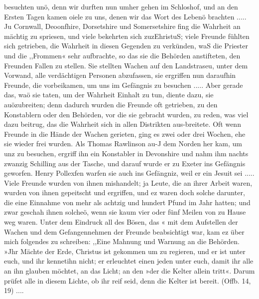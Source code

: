 besuchten unö, denn wir durften nun umher gehen im Schloshof,
und an den Ersten Tagen kamen oiele zu uns, denen wir das
Wort des Lebenö brachten .....
Ju Cornwall, Deoonfhire, Dorsetshire und Somersetshire
fing die Wahrheit an mächtig zu spriesen, und viele bekehrten sich
zuzEhristuS; viele Freunde fühlten sich getrieben, die Wahrheit
in diesen Gegenden zu verkünden, waS die Priester und die
,,Frommen« sehr aufbrachte, so das sie die Behörden anstifteten,
den Freunden Fallen zu stellen. Sie stellten Wachen auf den
Landstraseu, unter dem Vorwand, alle verdächtigen Personen
abzufassen, sie ergriffen nun daraufhin Freunde, die vorbeikamen,
um uns im Gefängnis zu besuchen ..... Aber gerade das,
waö sie taten, um der Wahrheit Einhalt zu tun, diente dazu, sie
auözubreiten; denn dadurch wurden die Freunde oft getrieben, zu
den Konstablern oder den Behörden, vor die sie gebracht wurden,
zu reden, was viel dazu beitrug, das die Wahrheit sich in allen
Distrikten aus-breitete. Oft wenn Freunde in die Hände der
Wachen gerieten, ging es zwei oder drei Wochen, ehe sie wieder
frei wurden.
Als Thomas Rawlinson au-J dem Norden her kam, um unz
zu besuchen, ergriff ihn ein Konstabler in Devonshire und nahm
ihm nachts zwanzig Schilling aus der Tasche, und darauf wurde
er zu Exeter ins Gefängnis geworfen. Henry Pollexfen warfen
sie auch ins Gefängniz, weil er ein Jesuit sei ..... Viele
Freunde wurden von ihnen mishandelt; ja Leute, die an ihrer
Arbeit waren, wurden von ihnen gepeitscht und ergriffen, und
ez waren doch solche darunter, die eine Einnahme von mehr
als achtzig und hundert Pfund im Jahr hatten; und zwar
geschah ihnen solcheö, wenn sie kaum vier oder fünf Meilen von
zu Hause weg waren. Unter dem Eindruck all des Bösen, das «
mit dem Aufstellen der Wachen und dem Gefangennehmen der
Freunde beabsichtigt war, kam ez über mich folgendes zu schreiben:
,,Eine Mahnung und Warnung an die Behörden.
»Jhr Mächte der Erde, Christus ist gekommen um zu regieren,
und er ist unter euch, und ihr kennetihn nicht; er erleuchtet einen
jeden unter euch, damit ihr alle an ihn glauben möchtet, an
das Licht; an den »der die Kelter allein tritt«. Darum prüfet
alle in diesem Lichte, ob ihr reif seid, denn die Kelter ist bereit.
(Offb. 14, 19) ....


